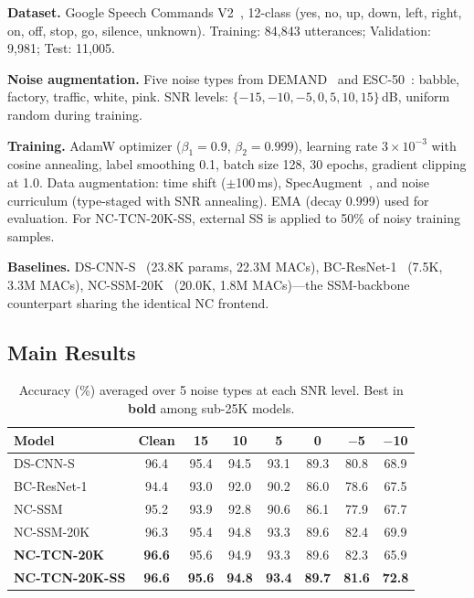 \documentclass[conference]{IEEEtran}
\begin{document}
\textbf{Dataset.}
Google Speech Commands V2~\cite{warden2018speech}, 12-class (yes, no, up, down, left, right, on, off, stop, go, silence, unknown).
Training: 84,843 utterances; Validation: 9,981; Test: 11,005.

\textbf{Noise augmentation.}
Five noise types from DEMAND~\cite{thiemann2013demand} and ESC-50~\cite{piczak2015esc}: babble, factory, traffic, white, pink.
SNR levels: $\{-15, -10, -5, 0, 5, 10, 15\}$\,dB, uniform random during training.

\textbf{Training.}
AdamW optimizer ($\beta_1{=}0.9$, $\beta_2{=}0.999$), learning rate $3 \times 10^{-3}$ with cosine annealing, label smoothing 0.1, batch size 128, 30 epochs, gradient clipping at 1.0.
Data augmentation: time shift ($\pm$100\,ms), SpecAugment~\cite{park2019specaugment}, and noise curriculum (type-staged with SNR annealing).
EMA (decay 0.999) used for evaluation.
For NC-TCN-20K-SS, external SS is applied to 50\% of noisy training samples.

\textbf{Baselines.}
DS-CNN-S~\cite{zhang2017hello} (23.8K params, 22.3M MACs),
BC-ResNet-1~\cite{kim2021broadcasted} (7.5K, 3.3M MACs),
NC-SSM-20K~\cite{choi2026ncssm} (20.0K, 1.8M MACs)---the SSM-backbone counterpart sharing the identical NC frontend.

\subsection{Main Results}

\begin{table}[t]
\centering
\caption{Accuracy (\%) averaged over 5 noise types at each SNR level. Best in \textbf{bold} among sub-25K models.}
\label{tab:noise}
\setlength{\tabcolsep}{3.8pt}
\begin{tabular}{@{}lccccccc@{}}
\toprule
\textbf{Model} & \textbf{Clean} & \textbf{15} & \textbf{10} & \textbf{5} & \textbf{0} & \textbf{$-$5} & \textbf{$-$10} \\
\midrule
DS-CNN-S & 96.4 & 95.4 & 94.5 & 93.1 & 89.3 & 80.8 & 68.9 \\
BC-ResNet-1 & 94.4 & 93.0 & 92.0 & 90.2 & 86.0 & 78.6 & 67.5 \\
NC-SSM & 95.2 & 93.9 & 92.8 & 90.6 & 86.1 & 77.9 & 67.7 \\
NC-SSM-20K & 96.3 & 95.4 & 94.8 & 93.3 & 89.6 & 82.4 & 69.9 \\
\midrule
\textbf{NC-TCN-20K} & \textbf{96.6} & 95.6 & 94.9 & 93.3 & 89.6 & 82.3 & 65.9 \\
\textbf{NC-TCN-20K-SS} & \textbf{96.6} & \textbf{95.6} & \textbf{94.8} & \textbf{93.4} & \textbf{89.7} & \textbf{81.6} & \textbf{72.8} \\
\bottomrule
\end{tabular}
\end{table}
\end{document}
